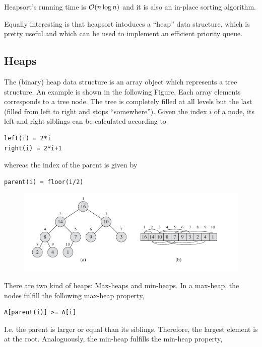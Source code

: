 
Heapsort's running time is $\mathcal{O}(n \log n)$ and it is also an in-place sorting algorithm.

Equally interesting is that heapsort intoduces a ``heap'' data structure, which is pretty useful and which can be used to implement an efficient priority queue.


\subsection {Heaps}

The (binary) heap data structure is an array object which represents a tree structure. An example is shown in the following Figure. Each array elements corresponds to a tree node. The tree is completely filled at all levels but the last (filled from left to right and stops ``somewhere''). Given the index $i$ of a node, its left and right siblings can be calculated according to

\begin{verbatim}
left(i) = 2*i
right(i) = 2*i+1
\end{verbatim}

whereas the index of the parent is given by

\begin{verbatim}
parent(i) = floor(i/2)
\end{verbatim}


\begin{figure}[hbt!]
\centering
\includegraphics[scale=0.7]{images/heapsort_1.png}
\end{figure}

There are two kind of heaps: Max-heaps and min-heaps. In a max-heap, the nodes fulfill the following max-heap property,

\begin{verbatim}
A[parent(i)] >= A[i]
\end{verbatim}

I.e. the parent is larger or equal than its siblings. Therefore, the largest element is at the root. Analoguously, the min-heap fulfills the min-heap property,

